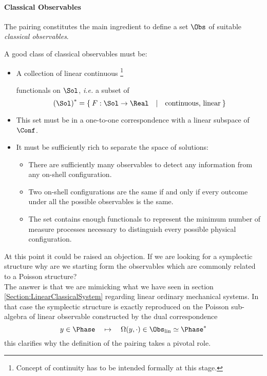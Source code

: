 \documentclass[Main]{subfiles}
\begin{document}
   		\paragraph{Classical Observables}
   		The pairing constitutes the main ingredient to define a set $\Obs$ of suitable \emph{classical observables}.
   		\begin{remark}
   			A good class of classical observables must be:
   			\begin{itemize}
   				\item A collection of  linear continuous 
   					\footnote{Concept of continuity has to be intended formally at this stage.}
   				
   				 functionals on $\Sol$, \textit{i.e.} a subset of
   					\begin{displaymath}
   						\left(\Sol\right)^* = \left\lbrace \: F : \Sol \rightarrow \Real \quad \vert \quad \textrm{continuous, linear} \:\right\rbrace
   					\end{displaymath}
   				\item This set must be in a one-to-one correspondence  with a linear subspace of $\Conf$.
   				\item It must be sufficiently rich to separate the space of solutions:
   					\begin{itemize}
   						\item There are sufficiently many observables to detect any information from any on-shell configuration.
   						\item Two on-shell configurations are the same if and only if every outcome under all the possible observables is the same.
   						\item The set contains enough functionals to represent the minimum number of measure processes necessary to distinguish every possible physical configuration.
   					\end{itemize}
   			\end{itemize}
   		\end{remark}

		\begin{observation}\label{Remark:whyObservables?}
		
		At this point it could be raised an objection. If we are looking for a symplectic structure why are we starting form the observables  which are commonly related to a Poisson structure?\\
		The answer is that we are mimicking what we have seen in section \ref{Section:LinearClassicalSystem} regarding linear ordinary mechanical systems.
		In that case the symplectic structure is exactly reproduced on the Poisson sub-algebra of linear observable constructed by the dual correspondence
		\begin{displaymath}
			y \in \Phase \quad \mapsto \quad \Omega( y , \cdot ) \in \Obs_{\textrm{lin}} \simeq \Phase^*
		\end{displaymath}
		this clarifies why the definition of the pairing takes a pivotal role.
		\end{observation}   		
   		
\end{document}
